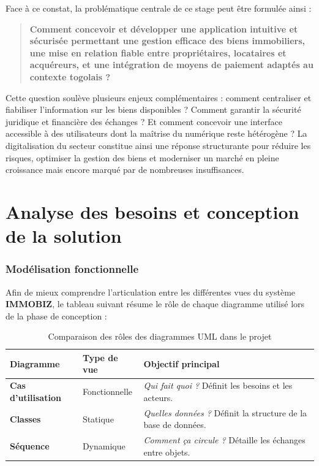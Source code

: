 \documentclass[12pt,a4paper]{report}
\newcommand{\important}[1]{\textcolor{cuivre}{\textbf{#1}}}
\begin{document}
\begin{highlightbox}
Face à ce constat, la problématique centrale de ce stage peut être formulée ainsi :

\begin{quote}
\important{Comment concevoir et développer une application  intuitive et sécurisée permettant une gestion efficace des biens immobiliers, une mise en relation fiable entre propriétaires, locataires et acquéreurs, et une intégration de moyens de paiement adaptés au contexte togolais ?}
\end{quote}

Cette question soulève plusieurs enjeux complémentaires : comment centraliser et fiabiliser l'information sur les biens disponibles ? Comment garantir la sécurité juridique et financière des échanges ? Et comment concevoir une interface accessible à des utilisateurs dont la maîtrise du numérique reste hétérogène ? La digitalisation du secteur constitue ainsi une réponse structurante pour réduire les risques, optimiser la gestion des biens et moderniser un marché en pleine croissance mais encore marqué par de nombreuses insuffisances.
\end{highlightbox}
\newpage

\chapter{Analyse des besoins et conception de la solution}

\subsection{Modélisation fonctionnelle}

Afin de mieux comprendre l'articulation entre les différentes vues du système \textbf{IMMOBIZ}, le tableau suivant résume le rôle de chaque diagramme utilisé lors de la phase de conception :
\begin{table}[H]
    \centering
    \begin{tabular}{|p{3cm}|p{3cm}|p{7cm}|}
        \hline
        \textbf{Diagramme} & \textbf{Type de vue} & \textbf{Objectif principal} \\ \hline
        \textbf{Cas d'utilisation} & Fonctionnelle & \textit{Qui fait quoi ?} Définit les besoins et les acteurs. \\ \hline
        \textbf{Classes} & Statique & \textit{Quelles données ?} Définit la structure de la base de données. \\ \hline
        \textbf{Séquence} & Dynamique & \textit{Comment ça circule ?} Détaille les échanges entre objets. \\ \hline
    \end{tabular}
    \caption{Comparaison des rôles des diagrammes UML dans le projet}
\end{table}
\end{document}
